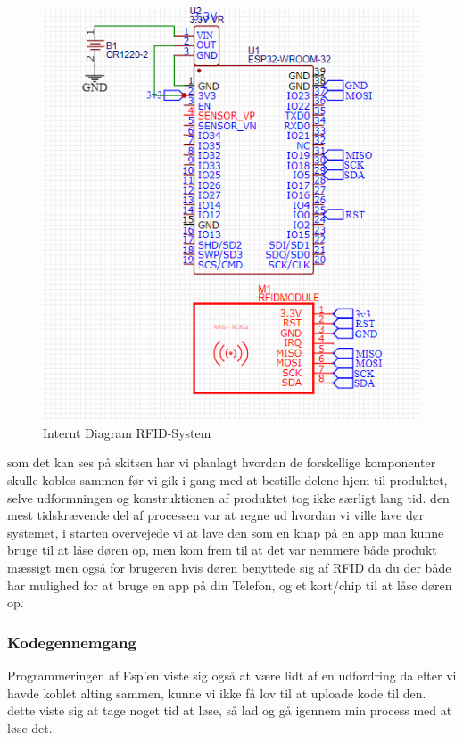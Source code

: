     \begin{figure}[H]
        \centering
        \includegraphics{assets/internalDiagram.png}
        \caption{Internt Diagram RFID-System}
    \end{figure}
    
    som det kan ses på skitsen har vi planlagt hvordan de forskellige komponenter skulle kobles sammen før vi gik i gang med at bestille delene hjem til produktet, selve udformningen og konstruktionen af produktet tog ikke særligt lang tid.
    den mest tidskrævende del af processen var at regne ud hvordan vi ville lave dør systemet, i starten overvejede vi at lave den som en knap på en app man kunne bruge til at låse døren op,
    men kom frem til at det var nemmere både produkt mæssigt men også for brugeren hvis døren benyttede sig af RFID da du der både har mulighed for at bruge en app på din Telefon, og et kort/chip til at låse døren op.


    \subsubsection{Kodegennemgang}

    Programmeringen af Esp'en viste sig også at være lidt af en udfordring da efter vi havde koblet alting sammen, kunne vi ikke få lov til at uploade kode til den. dette viste sig at tage noget tid at løse,
    så lad og gå igennem min process med at løse det.

